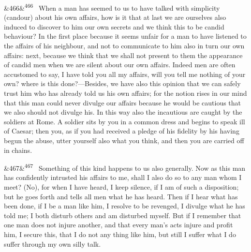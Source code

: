 \documentclass[12pt]{article}
\newcommand{\para}[1][]{\par\noindent\ifx&#1&\else\textsuperscript{\footnotesize #1}~\fi}
\begin{document}
\para[466] When a man has seemed to us to have talked with simplicity (candour) about his own affairs, how is it that at last we are ourselves also induced to discover to him our own secrets and we think this to be candid behaviour? In the first place because it seems unfair for a man to have listened to the affairs of his neighbour, and not to communicate to him also in turn our own affairs: next, because we think that we shall not present to them the appearance of candid men when we are silent about our own affairs. Indeed men are often accustomed to say, I have told you all my affairs, will you tell me nothing of your own? where is this done?—Besides, we have also this opinion that we can safely trust him who has already told us his own affairs; for the notion rises in our mind that this man could never divulge our affairs because he would be cautious that we also should not divulge his. In this way also the incautious are caught by the soldiers at Rome. A soldier sits by you in a common dress and begins to speak ill of Caesar; then you, as if you had received a pledge of his fidelity by his having begun the abuse, utter yourself also what you think, and then you are carried off in chains.

\para[467] Something of this kind happens to us also generally. Now as this man has confidently intrusted his affairs to me, shall I also do so to any man whom I meet? (No), for when I have heard, I keep silence, if I am of such a disposition; but he goes forth and tells all men what he has heard. Then if I hear what has been done, if I be a man like him, I resolve to be revenged, I divulge what he has told me; I both disturb others and am disturbed myself. But if I remember that one man does not injure another, and that every man's acts injure and profit him, I secure this, that I do not any thing like him, but still I suffer what I do suffer through my own silly talk.
\end{document}
